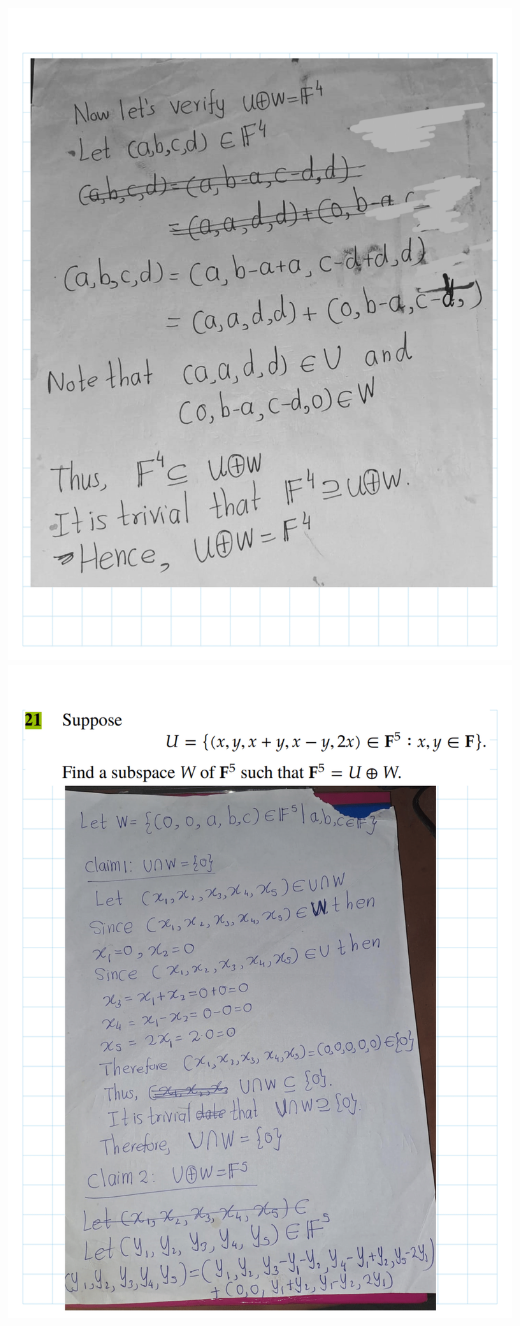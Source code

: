 \documentclass[
]{book}
\theoremstyle{definition}
\theoremstyle{definition}
\theoremstyle{definition}
\theoremstyle{definition}
\theoremstyle{remark}
\begin{document}
\begin{enumerate}
  \includegraphics{fig/Ex1C/Ex/Ex-24.png} \includegraphics{fig/Ex1C/Ex/Ex-25.png}

\end{enumerate}
\end{document}
